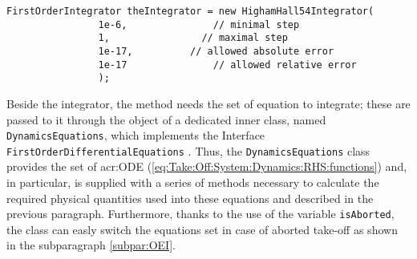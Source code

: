 \bigskip
\begin{lstlisting}[caption={HighamHall54Integrator class object creation}, captionpos=b, tabsize=2]
FirstOrderIntegrator theIntegrator = new HighamHall54Integrator(
				1e-6,				// minimal step 
				1,				  // maximal step 
				1e-17,			// allowed absolute error
				1e-17				// allowed relative error
				);
\end{lstlisting}
%
Beside the integrator, the method needs the set of equation to integrate; these are passed to it through the object of a dedicated inner class, named \lstinline[language=Java]!DynamicsEquations!, which implements the \gls{Interface} \lstinline[language=Java]!FirstOrderDifferentialEquations! \cite{apache:FirstOrderDifferentialEquations}. Thus, the \lstinline[language=Java]!DynamicsEquations! class provides the set of \gls{acr:ODE} (\ref{eq:Take:Off:System:Dynamics:RHS:functions}) and, in particular, is supplied with a series of methods necessary to calculate the required physical quantities used into these equations and described in the previous paragraph. Furthermore, thanks to the use of the variable \lstinline[language=Java]!isAborted!, the class can easly switch the equations set in case of aborted take-off as shown in the subparagraph \ref{subpar:OEI}.
%
